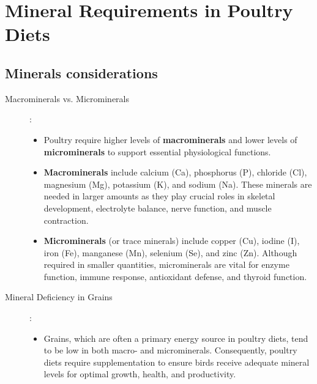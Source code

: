 \documentclass[a4paper,12pt]{article}
\begin{document}
\newpage

\section{Mineral Requirements in Poultry Diets}
\subsection{Minerals considerations}
\begin{description}
	\item[Macrominerals vs. Microminerals]:
		\begin{itemize}
			\item Poultry require higher levels of \textbf{macrominerals} and lower levels of
\textbf{microminerals} to support essential physiological functions.
			\item \textbf{Macrominerals} include calcium (Ca), phosphorus (P), chloride (Cl), magnesium
(Mg), potassium (K), and sodium (Na). These minerals are needed in larger
amounts as they play crucial roles in skeletal development, electrolyte balance,
nerve function, and muscle contraction.
			\item \textbf{Microminerals} (or trace minerals) include copper (Cu), iodine (I), iron (Fe), manganese (Mn), selenium (Se), and zinc (Zn). Although required in smaller
quantities, microminerals are vital for enzyme function, immune response,
antioxidant defense, and thyroid function.
		\end{itemize}
		
	\item[Mineral Deficiency in Grains]:
		\begin{itemize}
			\item Grains, which are often a primary energy source in poultry diets, tend to be low in both macro- and microminerals. Consequently, poultry diets require
supplementation to ensure birds receive adequate mineral levels for optimal
growth, health, and productivity.
		\end{itemize}
\end{description}
\end{document}
